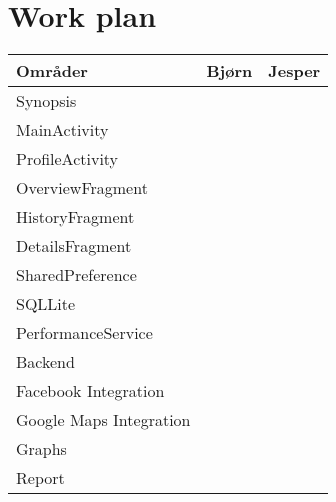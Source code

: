 \chapter{Work plan}


\begin{tabularx}{\textwidth}{|X|X|X|}
\hline 
\rowcolor{Gray}
\textbf{Områder} & Bjørn 	& Jesper \\ 
\hline

Synopsis 		&\checkmark &\checkmark	\\ 
\hline

MainActivity 		&\checkmark &\checkmark	\\ 
\hline

ProfileActivity 		&\checkmark &	\\ 
\hline

OverviewFragment 		&\checkmark &	\\ 
\hline

HistoryFragment 		& &\checkmark	\\ 
\hline

DetailsFragment 		& &\checkmark	\\ 
\hline

SharedPreference 		&\checkmark &	\\ 
\hline

SQLLite 		&\checkmark &	\\ 
\hline

PerformanceService 		&\checkmark &	\\ 
\hline

Backend 		& &\checkmark	\\ 
\hline

Facebook Integration 		& &\checkmark	\\ 
\hline

Google Maps Integration 		& &\checkmark	\\ 
\hline

Graphs 		&\checkmark &\checkmark	\\ 
\hline

Report 		&\checkmark &\checkmark	\\ 
\hline

\end{tabularx} 

%

